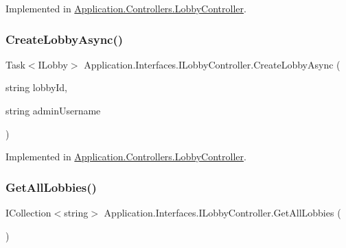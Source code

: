 Implemented in \mbox{\hyperlink{class_application_1_1_controllers_1_1_lobby_controller_ad0684f9eace44951fcb75c805fb8574c}{Application.\+Controllers.\+Lobby\+Controller}}.

\mbox{\label{interface_application_1_1_interfaces_1_1_i_lobby_controller_ae507a1d23088662b8c37692bbb93040e}} 
\subsubsection{\texorpdfstring{Create\+Lobby\+Async()}{CreateLobbyAsync()}}
{\footnotesize\ttfamily Task$<$I\+Lobby$>$ Application.\+Interfaces.\+I\+Lobby\+Controller.\+Create\+Lobby\+Async (\begin{DoxyParamCaption}\item[{string}]{lobby\+Id,  }\item[{string}]{admin\+Username }\end{DoxyParamCaption})}



Implemented in \mbox{\hyperlink{class_application_1_1_controllers_1_1_lobby_controller_ac08d941f7da12f7791a691dbbdf0c1f3}{Application.\+Controllers.\+Lobby\+Controller}}.

\mbox{\label{interface_application_1_1_interfaces_1_1_i_lobby_controller_a2e1d8f72361ee48e956fb473ceabadf4}} 
\subsubsection{\texorpdfstring{Get\+All\+Lobbies()}{GetAllLobbies()}}
{\footnotesize\ttfamily I\+Collection$<$string$>$ Application.\+Interfaces.\+I\+Lobby\+Controller.\+Get\+All\+Lobbies (\begin{DoxyParamCaption}{ }\end{DoxyParamCaption})}



